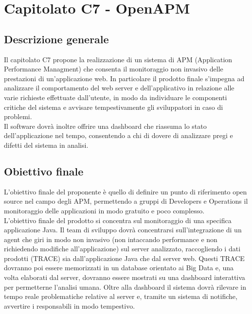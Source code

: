 \documentclass[StudioDiFattibilità.tex]{subfiles}
\begin{document}
\chapter{Capitolato C7 - OpenAPM}
\section{Descrizione generale}
Il capitolato C7 propone la realizzazione di un sistema di APM (Application Performance Managment) che consenta il monitoraggio non invasivo delle prestazioni di un'applicazione web. In particolare il prodotto finale s'impegna ad analizzare il comportamento del web server e dell'applicativo in relazione alle varie richieste effettuate dall'utente, in modo da individuare le componenti critiche del sistema e avvisare tempestivamente gli sviluppatori in caso di problemi.\\
Il software dovrà inoltre offrire una dashboard che riassuma lo stato dell'applicazione nel tempo, consentendo a chi di dovere di analizzare pregi e difetti del sistema in analisi.
\section{Obiettivo finale}
L'obiettivo finale del proponente è quello di definire un punto di riferimento open source nel campo degli APM, permettendo a gruppi di Developers e Operations il monitoraggio delle applicazioni in modo gratuito e poco complesso.\\
L'obiettivo finale del prodotto si concentra sul monitoraggio di una specifica applicazione Java. Il team di sviluppo dovrà concentrarsi sull'integrazione di un agent che giri in modo non invasivo (non intaccando performance e non richiedendo modifiche all'applicazione) sul server analizzato, raccogliendo i dati prodotti (TRACE) sia dall'applicazione Java che dal server web. Questi TRACE dovranno poi essere memorizzati in un database orientato ai Big Data e, una volta elaborati dal server, dovranno essere mostrati su una dashboard interattiva per permetterne l'analisi umana. Oltre alla dashboard il sistema dovrà rilevare in tempo reale problematiche relative al server e, tramite un sistema di notifiche, avvertire i responsabili in modo tempestivo.
\end{document}
